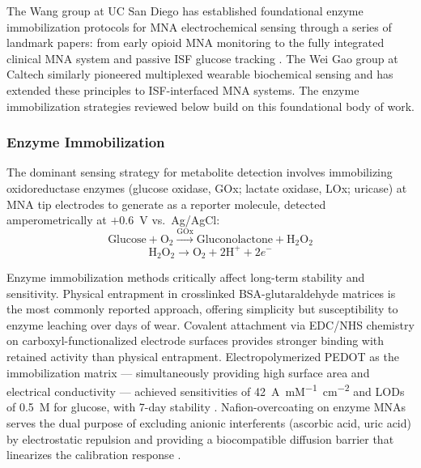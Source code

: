 \documentclass[review,1p]{elsarticle}
\begin{document}
The Wang group at UC San Diego has established foundational enzyme immobilization protocols for MNA electrochemical sensing through a series of landmark papers: from early opioid MNA monitoring \cite{Mishra2021MNA} to the fully integrated clinical MNA system \cite{Tehrani2022NatBiomedEng} and passive ISF glucose tracking \cite{Barfidokht2022Wang}. The Wei Gao group at Caltech similarly pioneered multiplexed wearable biochemical sensing \cite{Gao2016Multiplexed} and has extended these principles to ISF-interfaced MNA systems. The enzyme immobilization strategies reviewed below build on this foundational body of work.

\subsubsection{Enzyme Immobilization}

The dominant sensing strategy for metabolite detection involves immobilizing oxidoreductase enzymes (glucose oxidase, GOx; lactate oxidase, LOx; uricase) at MNA tip electrodes to generate  as a reporter molecule, detected amperometrically at $+0.6$~V vs.~Ag/AgCl:
\begin{equation}
\text{Glucose} + \text{O}_2 \xrightarrow{\text{GOx}} \text{Gluconolactone} + \text{H}_2\text{O}_2
\label{eq:gox}
\end{equation}
\begin{equation}
\text{H}_2\text{O}_2 \rightarrow \text{O}_2 + 2\text{H}^+ + 2e^-
\label{eq:h2o2}
\end{equation}

Enzyme immobilization methods critically affect long-term stability and sensitivity. Physical entrapment in crosslinked BSA-glutaraldehyde matrices is the most commonly reported approach, offering simplicity but susceptibility to enzyme leaching over days of wear. Covalent attachment via EDC/NHS chemistry on carboxyl-functionalized electrode surfaces provides stronger binding with retained activity than physical entrapment. Electropolymerized PEDOT as the immobilization matrix — simultaneously providing high surface area and electrical conductivity — achieved sensitivities of 42~\textmu{}A~mM\textsuperscript{$-1$}~cm\textsuperscript{$-2$} and LODs of 0.5~\textmu{}M for glucose, with 7-day stability \cite{Sharma2022AFE}. Nafion-overcoating on enzyme MNAs serves the dual purpose of excluding anionic interferents (ascorbic acid, uric acid) by electrostatic repulsion and providing a biocompatible diffusion barrier that linearizes the calibration response \cite{Mohan2021}.
\end{document}

